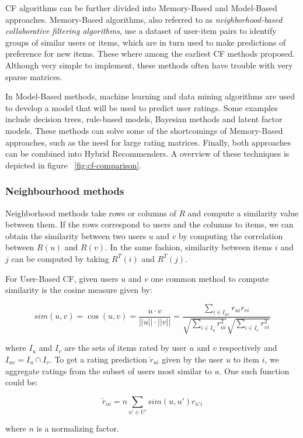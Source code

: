 \documentclass[cic,tc,english]{iiufrgs}
\begin{document}
CF algorithms can be further divided into Memory-Based and Model-Based approaches. Memory-Based algorithms, also referred to as \textit{neighborhood-based collaborative filtering algorithms}, use a dataset of user-item pairs to identify groups of similar users or items, which are in turn used to make predictions of preference for new items. These where among the earliest CF methods proposed. Although very simple to implement, these methods often have trouble with very sparse matrices.

In Model-Based methods, machine learning and data mining algorithms are used to develop a model that will be used to predict user ratings. Some examples include decision trees, rule-based models, Bayesian methods and latent factor models. These methods can solve some of the shortcomings of Memory-Based approaches, such as the need for large rating matrices. Finally, both approaches can be combined into Hybrid Recommenders. A overview of these techniques is depicted in figure ~\ref{fig:cf-comparison}.

\subsubsection{Neighbourhood methods}
Neighborhood methods take rows or columns of \(R\) and compute a similarity value between them. If the rows correspond to users and the columns to items, we can obtain the similarity between two users \(u\) and \(v\) by computing the correlation between \(R(u)\) and \(R(v)\). In the same fashion, similarity between items \(i\) and \(j\) can be computed by taking \(R^T(i)\) and \(R^T(j)\).

For User-Based CF, given users \(u\) and \(v\) one common method to compute similarity is the cosine measure given by:

$$sim(u, v) = \cos(u, v) = \frac {u \cdot v}{|| u|| \cdot ||v||} = \frac{\sum_{i \in I_{uv}} r_{ui}r_{vi}}{\sqrt{\sum_{i \in I_u} r_{ui}^2}\sqrt{\sum_{i \in I_v} r_{vi}^2}}$$

where $I_u$ and $I_v$ are the sets of items rated by user $u$ and $v$ respectively and $I_{uv} = I_u \cap I_v$. 
To get a rating prediction $\check{r}_{ui}$ given by the user $u$ to item $i$, we aggregate ratings from the subset of users most similar to $u$. One such function could be:

$$
\check{r}_{ui} = n \sum_{u' \in U'} sim(u, u')r_{u'i}
$$

where $n$ is a normalizing factor.
\end{document}
